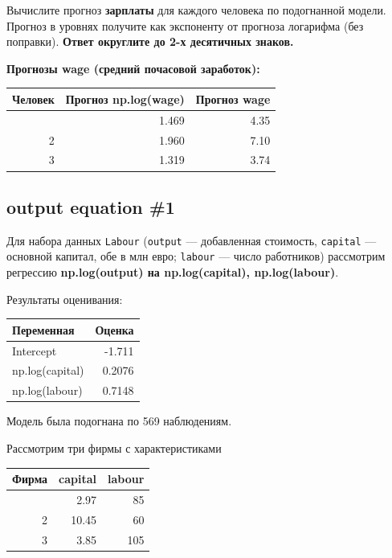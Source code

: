 \documentclass[
  russian,
]{article}
\newcounter{none} %
\begin{document}
Вычислите прогноз \textbf{зарплаты} для каждого человека по подогнанной
модели. Прогноз в уровнях получите как экспоненту от прогноза логарифма
(без поправки). \textbf{Ответ округлите до 2-х десятичных знаков.}

\textbf{Прогнозы wage (средний почасовой заработок):}

{\def\LTcaptype{none} %
\begin{longtable}[]{@{}rrr@{}}
\toprule\noalign{}
Человек & Прогноз np.log(wage) & Прогноз wage \\
\midrule\noalign{}
\endhead
\bottomrule\noalign{}
\endlastfoot
1 & 1.469 & 4.35 \\
2 & 1.960 & 7.10 \\
3 & 1.319 & 3.74 \\
\end{longtable}
}

\subsection{output equation \#1}\label{output-equation-1}

Для набора данных \texttt{Labour} (\texttt{output} --- добавленная
стоимость, \texttt{capital} --- основной капитал, обе в млн евро;
\texttt{labour} --- число работников) рассмотрим регрессию
\textbf{np.log(output) на np.log(capital), np.log(labour)}.

Результаты оценивания:

{\def\LTcaptype{none} %
\begin{longtable}[]{@{}lr@{}}
\toprule\noalign{}
Переменная & Оценка \\
\midrule\noalign{}
\endhead
\bottomrule\noalign{}
\endlastfoot
Intercept & -1.711 \\
np.log(capital) & 0.2076 \\
np.log(labour) & 0.7148 \\
\end{longtable}
}

Модель была подогнана по 569 наблюдениям.

Рассмотрим три фирмы с характеристиками

{\def\LTcaptype{none} %
\begin{longtable}[]{@{}rrr@{}}
\toprule\noalign{}
Фирма & capital & labour \\
\midrule\noalign{}
\endhead
\bottomrule\noalign{}
\endlastfoot
1 & 2.97 & 85 \\
2 & 10.45 & 60 \\
3 & 3.85 & 105 \\
\end{longtable}
}
\end{document}
